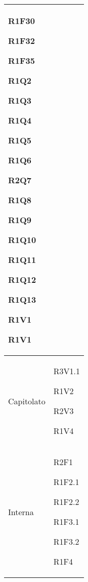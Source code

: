 \begin{center}
\begin{longtable}{|p{44mm}|p{22mm}|}
R1F30 \newline

R1F32 \newline

R1F35 \newline

R1Q2 \newline

R1Q3 \newline

R1Q4 \newline

R1Q5 \newline

R1Q6 \newline

R2Q7 \newline

R1Q8 \newline

R1Q9 \newline

R1Q10 \newline

R1Q11 \newline

R1Q12 \newline

R1Q13 \newline

 R1V1 \newline

 R1V1
\\
\hline
Capitolato &
R3V1.1 \newline

R1V2 \newline

R2V3 \newline

R1V4 \newline
\\
\hline
Interna &

 R2F1 \newline

R1F2.1 \newline

R1F2.2 \newline

R1F3.1 \newline

R1F3.2 \newline

R1F4 \newline


\end{longtable}
\end{center}
